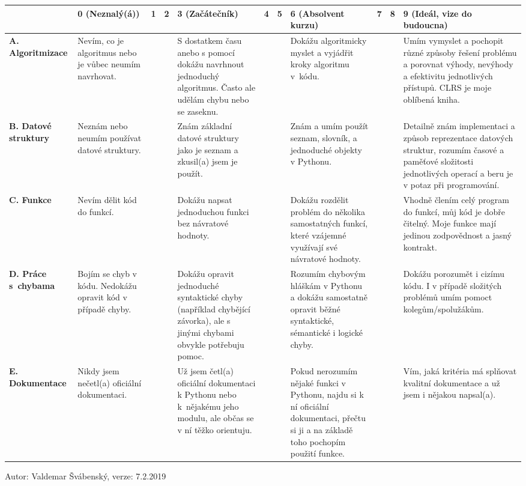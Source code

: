 \documentclass{article}
\begin{document}
\begin{table}[H]
\centering
\begin{tabular}{|l|p{2.5cm}|l|l|p{4.5cm}|l|l|p{4.5cm}|l|l|p{4.5cm}|}
\hline
& 0 (Neznalý(á)) & 1 & 2 & 3 (Začátečník) & 4 & 5 & 6 (Absolvent kurzu) & 7 & 8 & 9 (Ideál, vize do budoucna) \\ \hline

\textbf{A. Algoritmizace}
& Nevím, co je algoritmus nebo je vůbec neumím navrhovat. & &
& S dostatkem času anebo s pomocí dokážu navrhnout jednoduchý algoritmus. Často ale udělám chybu nebo se zaseknu. & & 
& Dokážu algoritmicky myslet a vyjádřit kroky algoritmu v~kódu. & & 
& Umím vymyslet a pochopit různé způsoby řešení problému a porovnat výhody, nevýhody a efektivitu jednotlivých přístupů. CLRS je moje oblíbená kniha. \\ \hline

\textbf{B. Datové struktury}
& Neznám nebo neumím používat datové struktury. & &
& Znám základní datové struktury jako je seznam a zkusil(a) jsem je použít. & & 
& Znám a umím použít seznam, slovník, a jednoduché objekty v Pythonu. & & 
& Detailně znám implementaci a způsob reprezentace datových struktur, rozumím časové a paměťové složitosti jednotlivých operací a beru je v potaz při programování. \\ \hline

\textbf{C. Funkce}
& Nevím dělit kód do funkcí. & &
& Dokážu napsat jednoduchou funkci bez návratové hodnoty. & & 
& Dokážu rozdělit problém do několika samostatných funkcí, které vzájemné využívají své návratové hodnoty. & & 
& Vhodně člením celý program do funkcí, můj kód je dobře čitelný. Moje funkce mají jedinou zodpovědnost a jasný kontrakt. \\ \hline

\textbf{D. Práce s~chybama}
& Bojím se chyb v kódu. Nedokážu opravit kód v případě chyby. & &
& Dokážu opravit jednoduché syntaktické chyby (například chybějící závorka), ale s jinými chybami obvykle potřebuju pomoc. & & 
& Rozumím chybovým hláškám v Pythonu a dokážu samostatně opravit běžné syntaktické, sémantické i logické chyby. & & 
& Dokážu porozumět i cizímu kódu. I v případě složitých problémů umím pomoct kolegům/spolužákům. \\ \hline

\textbf{E. Dokumentace}
& Nikdy jsem nečetl(a) oficiální dokumentaci. & &
& Už jsem četl(a) oficiální dokumentaci k Pythonu nebo k~nějakému jeho modulu, ale občas se v ní těžko orientuju. & & 
& Pokud nerozumím nějaké funkci v Pythonu, najdu si k ní oficiální dokumentaci, přečtu si ji a na základě toho pochopím použití funkce. & & 
& Vím, jaká kritéria má splňovat kvalitní dokumentace a už jsem i nějakou napsal(a). \\ \hline
\end{tabular}
\end{table}

\vfill
\begin{center}
\small Autor: Valdemar Švábenský, verze: 7.2.2019
\end{center}
\end{document}
